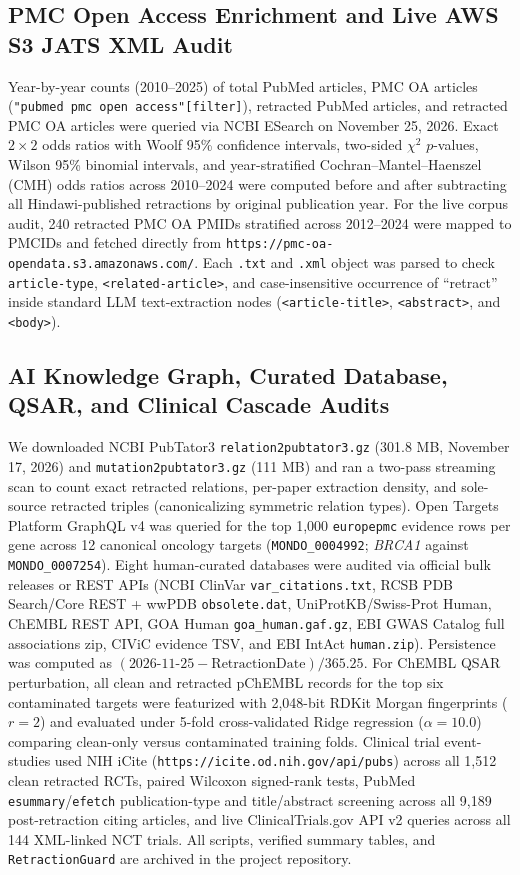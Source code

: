 \documentclass[11pt,letterpaper]{article}
\begin{document}
\subsection{PMC Open Access Enrichment and Live AWS S3 JATS XML Audit}
Year-by-year counts (2010--2025) of total PubMed articles, PMC OA articles (\texttt{"pubmed pmc open access"[filter]}), retracted PubMed articles, and retracted PMC OA articles were queried via NCBI ESearch on November 25, 2026. Exact $2\times 2$ odds ratios with Woolf 95\% confidence intervals, two-sided $\chi^2$ $p$-values, Wilson 95\% binomial intervals, and year-stratified Cochran--Mantel--Haenszel (CMH) odds ratios across 2010--2024 were computed before and after subtracting all Hindawi-published retractions by original publication year. For the live corpus audit, 240 retracted PMC OA PMIDs stratified across 2012--2024 were mapped to PMCIDs and fetched directly from \texttt{https://pmc-oa-opendata.s3.amazonaws.com/}. Each \texttt{.txt} and \texttt{.xml} object was parsed to check \texttt{article-type}, \texttt{<related-article>}, and case-insensitive occurrence of ``retract'' inside standard LLM text-extraction nodes (\texttt{<article-title>}, \texttt{<abstract>}, and \texttt{<body>}).

\subsection{AI Knowledge Graph, Curated Database, QSAR, and Clinical Cascade Audits}
We downloaded NCBI PubTator3 \texttt{relation2pubtator3.gz} (301.8 MB, November 17, 2026) and \texttt{mutation2pubtator3.gz} (111 MB) and ran a two-pass streaming scan to count exact retracted relations, per-paper extraction density, and sole-source retracted triples (canonicalizing symmetric relation types). Open Targets Platform GraphQL v4 was queried for the top 1,000 \texttt{europepmc} evidence rows per gene across 12 canonical oncology targets (\texttt{MONDO\_0004992}; \emph{BRCA1} against \texttt{MONDO\_0007254}). Eight human-curated databases were audited via official bulk releases or REST APIs (NCBI ClinVar \texttt{var\_citations.txt}, RCSB PDB Search/Core REST + wwPDB \texttt{obsolete.dat}, UniProtKB/Swiss-Prot Human, ChEMBL REST API, GOA Human \texttt{goa\_human.gaf.gz}, EBI GWAS Catalog full associations zip, CIViC evidence TSV, and EBI IntAct \texttt{human.zip}). Persistence was computed as $(\text{2026-11-25} - \text{RetractionDate})/365.25$. For ChEMBL QSAR perturbation, all clean and retracted pChEMBL records for the top six contaminated targets were featurized with 2,048-bit RDKit Morgan fingerprints ($r=2$) and evaluated under 5-fold cross-validated Ridge regression ($\alpha=10.0$) comparing clean-only versus contaminated training folds. Clinical trial event-studies used NIH iCite (\texttt{https://icite.od.nih.gov/api/pubs}) across all 1,512 clean retracted RCTs, paired Wilcoxon signed-rank tests, PubMed \texttt{esummary}/\texttt{efetch} publication-type and title/abstract screening across all 9,189 post-retraction citing articles, and live ClinicalTrials.gov API v2 queries across all 144 XML-linked NCT trials. All scripts, verified summary tables, and \texttt{RetractionGuard} are archived in the project repository.



\end{document}
